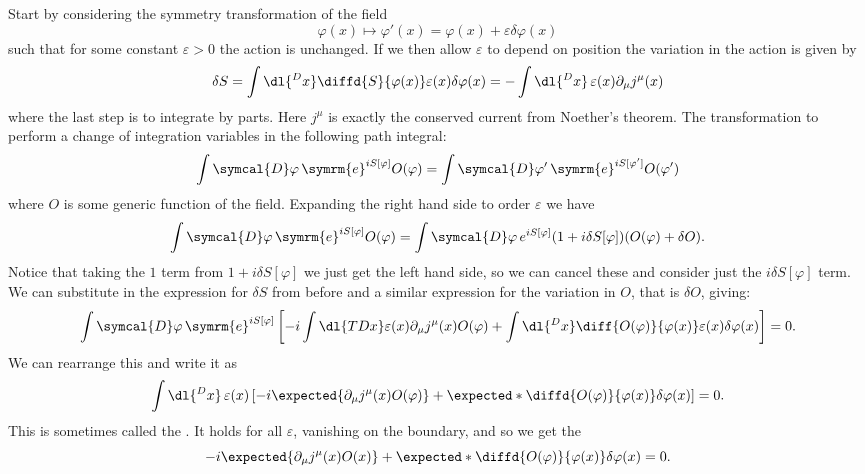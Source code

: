 \documentclass[fleqn]{NotesClass}
\newcommand{\e}{\symrm{e}}
\newcommand{\DL}[1]{\symcal{D}#1}
\begin{document}
    Start by considering the symmetry transformation of the field
    \begin{equation}
        \varphi(x) \mapsto \varphi'(x) = \varphi(x) + \varepsilon \delta\varphi(x)
    \end{equation}
    such that for some constant \(\varepsilon > 0\) the action is unchanged.
    If we then allow \(\varepsilon\) to depend on position the variation in the action is given by
    \begin{equation}
        \delta S = \int \dl{^Dx} \diffd{S}{\varphi(x)} \varepsilon(x) \delta\varphi(x) = -\int \dl{^Dx} \, \varepsilon(x) \partial_\mu j^\mu(x)
    \end{equation}
    where the last step is to integrate by parts.
    Here \(j^\mu\) is exactly the conserved current from Noether's theorem.
    The transformation to perform a change of integration variables in the following path integral:
    \begin{equation}
        \int \DL{\varphi} \, \e^{iS[\varphi]} O(\varphi) = \int \DL{\varphi'} \, \e^{iS[\varphi']}O(\varphi')
    \end{equation}
    where \(O\) is some generic function of the field.
    Expanding the right hand side to order \(\varepsilon\) we have
    \begin{equation}
        \int \DL{\varphi} \, \e^{iS[\varphi]} O(\varphi) = \int \DL{\varphi} \,  e^{iS[\varphi]} (1 + i\delta S[\varphi]) (O(\varphi) + \delta O).
    \end{equation}
    Notice that taking the \(1\) term from \(1 + i\delta S[\varphi]\) we just get the left hand side, so we can cancel these and consider just the \(i\delta S[\varphi]\) term.
    We can substitute in the expression for \(\delta S\) from before and a similar expression for the variation in \(O\), that is \(\delta O\), giving:
    \begin{equation}
        \int \DL{\varphi} \, \e^{iS[\varphi]} \left[ -i \int \dl{TDx}\varepsilon(x) \partial_\mu j^\mu(x) O(\varphi) + \int \dl{^Dx} \diff{O(\varphi)}{\varphi(x)} \varepsilon(x) \delta\varphi(x) \right] = 0.
    \end{equation}
    We can rearrange this and write it as
    \begin{equation}
        \int \dl{^Dx} \, \varepsilon(x) \left[ -i \expected{\partial_\mu j^\mu(x) O(\varphi)} + \expected*{\diffd{O(\varphi)}{\varphi(x)} \delta\varphi(x)} \right] = 0.
    \end{equation}
    This is sometimes called the .
    It holds for all \(\varepsilon\), vanishing on the boundary, and so we get the 
    \begin{equation}
        -i\expected{\partial_\mu j^\mu(x)O(x)} + \expected*{\diffd{O(\varphi)}{\varphi(x)} \delta \varphi(x)} = 0.
    \end{equation}
    
\end{document}
